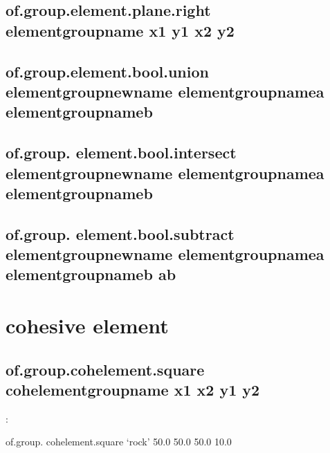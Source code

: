 \documentclass[letterpaper,10pt,english]{sphinxmanual}
\begin{document}
\subsection{of.group.element.plane.right elementgroupname x1 y1 x2 y2}
\label{\detokenize{rst_tutorials/command_line_guide:of-group-element-plane-right-elementgroupname-x1-y1-x2-y2}}

\subsection{of.group.element.bool.union elementgroupnewname elementgroupnamea elementgroupnameb}
\label{\detokenize{rst_tutorials/command_line_guide:of-group-element-bool-union-elementgroupnewname-elementgroupnamea-elementgroupnameb}}

\subsection{of.group. element.bool.intersect elementgroupnewname elementgroupnamea elementgroupnameb}
\label{\detokenize{rst_tutorials/command_line_guide:of-group-element-bool-intersect-elementgroupnewname-elementgroupnamea-elementgroupnameb}}

\subsection{of.group. element.bool.subtract elementgroupnewname elementgroupnamea elementgroupnameb a\sphinxhyphen{}b}
\label{\detokenize{rst_tutorials/command_line_guide:of-group-element-bool-subtract-elementgroupnewname-elementgroupnamea-elementgroupnameb-a-b}}\label{\detokenize{rst_tutorials/command_line_guide:section-1}}

\section{cohesive element}
\label{\detokenize{rst_tutorials/command_line_guide:cohesive-element}}

\subsection{of.group.cohelement.square cohelementgroupname x1 x2 y1 y2}
\label{\detokenize{rst_tutorials/command_line_guide:of-group-cohelement-square-cohelementgroupname-x1-x2-y1-y2}}
:

\begin{sphinxVerbatim}[commandchars=\\\{\}]
of.group. cohelement.square ‘rock’ \PYGZhy{}50.0 50.0 \PYGZhy{}50.0 10.0
\end{sphinxVerbatim}
\end{document}
